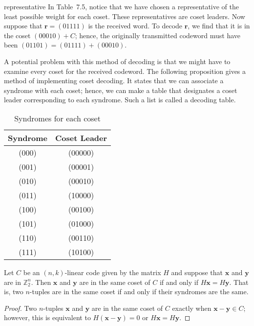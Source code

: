 \begin{example}{representative}
In Table~7.5, notice that we have chosen a representative of the least
possible weight for each coset.  These representatives are coset
leaders. Now suppose that ${\mathbf r} = (01111)$ is the received word.
To decode ${\mathbf r}$, we find that it is in the coset $(00010) + C$;
hence, the originally transmitted codeword must have been $(01101) =
(01111) + (00010)$. 
\end{example}
 
 
A potential problem with this method of decoding is that we might have
to examine every coset for the received codeword. The following
proposition gives a method of implementing coset decoding. It states
that we can associate a syndrome with each coset; hence, we can make a
table that designates a coset leader corresponding to each syndrome. Such
a list is called a {\bfi decoding table}.
 
 
 \begin{table}[htb]
{\small
\begin{center}
\begin{tabular}{|c|c|}
\hline
Syndrome & Coset Leader \\
\hline
(000) & (00000) \\
(001) & (00001) \\
(010) & (00010) \\
(011) & (10000) \\
(100) & (00100) \\
(101) & (01000) \\
(110) & (00110) \\
(111) & (10100) \\
\hline
\end{tabular}
\end{center}
}
\caption{Syndromes for each coset}
\end{table}
 
\begin{proposition}
Let $C$ be an $(n,k)$-linear code given by the matrix $H$ and suppose
that ${\mathbf x}$ and ${\mathbf y}$ are in ${\mathbb Z}_2^n$. Then ${\mathbf
x}$ and ${\mathbf y}$ are in the same coset of $C$ if and only if
$H{\mathbf x} = H{\mathbf y}$. That is, two $n$-tuples are in the same
coset if and only if their syndromes are the same.
\end{proposition}
 
 
\begin{proof}
Two $n$-tuples ${\mathbf x}$ and ${\mathbf y}$ are in the same coset of
$C$ exactly when ${\mathbf x} - {\mathbf y} \in C$; however, this is
equivalent to $H({\mathbf x} - {\mathbf y}) = 0$ or $H {\mathbf x} = H
{\mathbf y}$. 
\end{proof}
 
